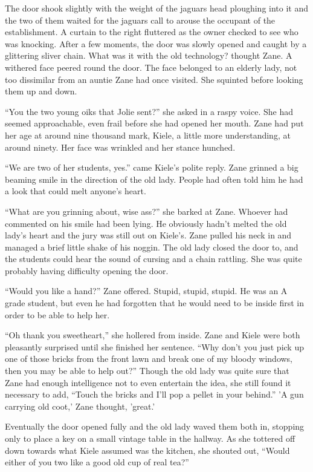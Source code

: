 The door shook slightly with the weight of the jaguars head ploughing into it and the two of them waited for the jaguars call to arouse the occupant of the establishment.  A curtain to the right fluttered as the owner checked to see who was knocking.  After a few moments, the door was slowly opened and caught by a glittering sliver chain.  What was it with the old technology? thought Zane.  A withered face peered round the door.  The face belonged to an elderly lady, not too dissimilar from an auntie Zane had once visited.  She squinted before looking them up and down.

``You the two young oiks that Jolie sent?'' she asked in a raspy voice.  She had seemed approachable, even frail before she had opened her mouth.  Zane had put her age at around nine thousand mark, Kiele, a little more understanding, at around ninety.  Her face was wrinkled and her stance hunched.  

``We are two of her students, yes.'' came Kiele's polite reply.  Zane grinned a big beaming smile in the direction of the old lady.  People had often told him he had a look that could melt anyone's heart.  

``What are you grinning about, wise ass?'' she barked at Zane.  Whoever had commented on his smile had been lying.  He obviously hadn't melted the old lady's heart and the jury was still out on Kiele's.  Zane pulled his neck in and managed a brief little shake of his noggin.  The old lady closed the door to, and the students could hear the sound of cursing and a chain rattling.  She was quite probably having difficulty opening the door.

``Would you like a hand?'' Zane offered.  Stupid, stupid, stupid.  He was an A grade student, but even he had forgotten that he would need to be inside first in order to be able to help her.

``Oh thank you sweetheart,'' she hollered  from inside.  Zane and Kiele were both pleasantly surprised until she finished her sentence.  ``Why don't you just pick up one of those bricks from the front lawn and break one of my bloody windows, then you may be able to help out?''  Though the old lady was quite sure that Zane had enough intelligence not to even entertain the idea, she still found it necessary to add, ``Touch the bricks and I'll pop a pellet in your behind.''  'A gun carrying old coot,' Zane thought, 'great.'

Eventually the door opened fully and the old lady waved them both in, stopping only to place a key on a small vintage table in the hallway.  As she tottered off down towards what Kiele assumed was the kitchen, she shouted out, ``Would either of you two like a good old cup of real tea?''  

